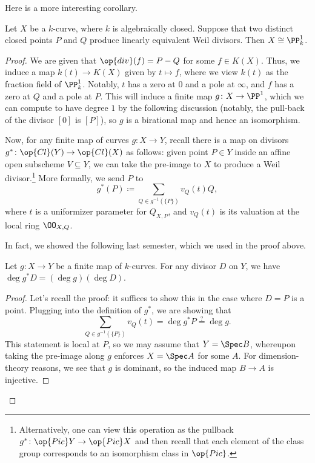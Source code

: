 \documentclass[../notes.tex]{subfiles}
\begin{document}
Here is a more interesting corollary.
\begin{lemma} \label{lem:get-to-p1}
	Let $X$ be a $k$-curve, where $k$ is algebraically closed. Suppose that two distinct closed points $P$ and $Q$ produce linearly equivalent Weil divisors. Then $X\cong\PP^1_k$.
\end{lemma}
\begin{proof}
	We are given that $\op{div}(f)=P-Q$ for some $f\in K(X)$. Thus, we induce a map $k(t)\to K(X)$ given by $t\mapsto f$, where we view $k(t)$ as the fraction field of $\PP^1_k$. Notably, $t$ has a zero at $0$ and a pole at $\infty$, and $f$ has a zero at $Q$ and a pole at $P$. This will induce a finite map $g\colon X\to\PP^1$, which we can compute to have degree $1$ by the following discussion (notably, the pull-back of the divisor $[0]$ is $[P]$), so $g$ is a birational map and hence an isomorphism.

	Now, for any finite map of curves $g\colon X\to Y$, recall there is a map on divisors $g^*\colon\op{Cl}(Y)\to\op{Cl}(X)$ as follows: given point $P\in Y$ inside an affine open subscheme $V\subseteq Y$, we can take the pre-image to $X$ to produce a Weil divisor.\footnote{Alternatively, one can view this operation as the pullback $g^*\colon\op{Pic}Y\to\op{Pic}X$ and then recall that each element of the class group corresponds to an isomorphism class in $\op{Pic}$.} More formally, we send $P$ to
	\[g^*(P)\coloneqq\sum_{Q\in g^{-1}(\{P\})}v_Q(t)Q,\]
	where $t$ is a uniformizer parameter for $Q_{X,P}$, and $v_Q(t)$ is its valuation at the local ring $\OO_{X,Q}$.
	
	In fact, we showed the following last semester, which we used in the proof above.
	\begin{proposition}
		Let $g\colon X\to Y$ be a finite map of $k$-curves. For any divisor $D$ on $Y$, we have $\deg g^*D=(\deg g)(\deg D)$.
	\end{proposition}
	\begin{proof}
		Let's recall the proof: it suffices to show this in the case where $D=P$ is a point. Plugging into the definition of $g^*$, we are showing that
		\[\sum_{Q\in g^{-1}(\{P\})}v_Q(t)=\deg g^*P\stackrel?=\deg g.\]
		This statement is local at $P$, so we may assume that $Y=\Spec B$, whereupon taking the pre-image along $g$ enforces $X=\Spec A$ for some $A$. For dimension-theory reasons, we see that $g$ is dominant, so the induced map $B\to A$ is injective.
		

\end{proof}
\end{proof}
\end{document}

